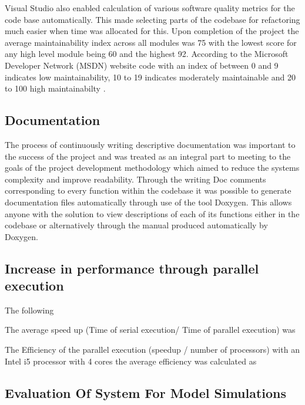 Visual Studio also enabled calculation of various software quality metrics for the code base automatically. This made selecting parts of the codebase for refactoring much easier when time was allocated for this. Upon completion of the project the average maintainability index across all modules was 75 with the lowest score for any high level module being 60 and the highest 92. According to the Microsoft Developer Network (MSDN) website code with an index of between 0 and 9 indicates low maintainability, 10 to 19 indicates moderately maintainable and 20 to 100 high maintainabilty \cite{VisualStudioMaintainIndex}.

\subsection{Documentation}
The process of continuously writing descriptive documentation was important to the success of the project and was treated as an integral part to meeting to the goals of the project development methodology which aimed to reduce the systems complexity and improve readability. Through the writing Doc comments corresponding to every function within the codebase it was possible to generate documentation files automatically through use of the tool Doxygen. This allows anyone with the solution to view descriptions of each of its functions either in the codebase or alternatively through the manual produced automatically by Doxygen.



\subsection{Increase in performance through parallel execution}
The following 

The average speed up (Time of serial execution/ Time of parallel execution) was 

The Efficiency of the parallel execution (speedup / number of processors) with an Intel i5 processor with 4 cores the average efficiency  was calculated as

 

\subsection{Evaluation Of System For Model Simulations}


